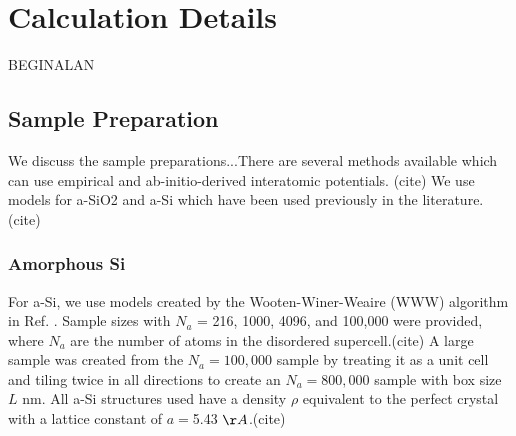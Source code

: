 \documentclass[aps,prb,onecolumn,preprint,superscriptaddress,footinbib,amsmath,amssymb,floatfix]{revtex4}
\begin{document}




\section{\label{S:Calculation}Calculation Details}
BEGINALAN
\subsection{\label{S:Sample}Sample Preparation}

We discuss the sample preparations...There are several methods available 
which can use empirical and ab-initio-derived interatomic potentials.
(cite) We use models for a-SiO2 and a-Si which have been used previously 
in the literature.(cite) 

\subsubsection{\label{S:Sample:Si}Amorphous Si}

For a-Si, we use models created by the Wooten-Winer-Weaire (WWW) algorithm in  
Ref. .  Sample sizes with $N_a$ =  
216, 1000, 4096, and 100,000 were provided, where $N_a$ are the number of 
atoms in the disordered supercell.(cite)  
A large sample was created from the $N_a = 100,000$ sample 
by treating it 
as a unit cell and tiling twice in all directions to create an 
$N_a = 800,000$ sample with box size $L$ nm. 
All a-Si structures used have a density $\rho$ equivalent to the perfect 
crystal with a lattice constant of $a=$5.43 $\AA$.(cite) 
\end{document}
